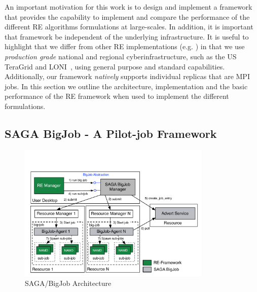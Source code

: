 \documentclass{rspublic}
\begin{document}
An important motivation for this work is to design and implement a
framework that provides the capability to implement and compare the
performance of the different RE algorithms formulations at
large-scales.  In addition, it is important that framework be
independent of the underlying infrastructure.  It is useful to
highlight that we differ from other RE implementations (e.g.
\cite{parashar_arepex}) in that we use {\it production grade}
national and regional cyberinfrastructure, such as the US TeraGrid and
LONI~\citep{LONI_web}, using general purpose and standard
capabilities.  Additionally, our framework {\it natively} supports
individual replicas that are MPI jobs. In this section we outline the
architecture, implementation and the basic performance of the RE
framework when used to implement the different formulations.



\subsection{SAGA BigJob - A Pilot-job Framework}
\label{sec:BigJob}


\begin{figure}[t]
      \centering
          \includegraphics[width=0.82\textwidth]{../figures/Bigjob_arch.pdf}
          \caption{\footnotesize SAGA/BigJob Architecture
              }
      \label{fig:bigjob}
\end{figure}
\end{document}
